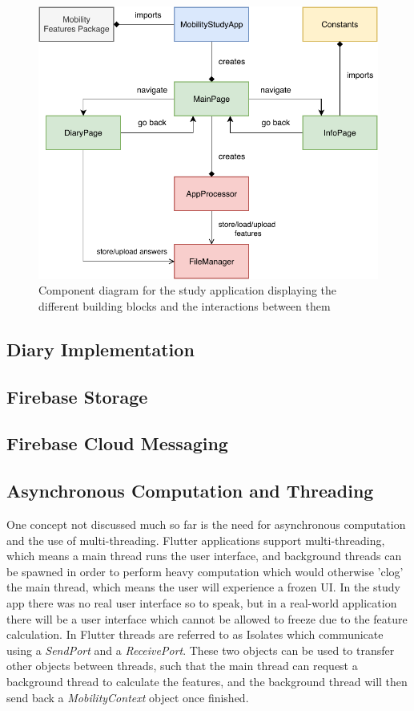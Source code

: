 \begin{figure}
    \centering
    \includegraphics[width=\textwidth]{images/diagrams/app-diagram.pdf}
    \caption{Component diagram for the study application displaying the different building blocks and the interactions between them}
    \label{fig:app-component-diagram}
\end{figure}

\subsection{Diary Implementation}

\subsection{Firebase Storage}

\subsection{Firebase Cloud Messaging}


\subsection{Asynchronous Computation and Threading}
One concept not discussed much so far is the need for asynchronous computation and the use of multi-threading. Flutter applications support multi-threading, which means a main thread runs the user interface, and background threads can be spawned in order to perform heavy computation which would otherwise 'clog' the main thread, which means the user will experience a frozen UI. In the study app there was no real user interface so to speak, but in a real-world application there will be a user interface which cannot be allowed to freeze due to the feature calculation. In Flutter threads are referred to as Isolates which communicate using a \textit{SendPort} and a \textit{ReceivePort}. These two objects can be used to transfer other objects between threads, such that the main thread can request a background thread to calculate the features, and the background thread will then send back a \textit{MobilityContext} object once finished. 

